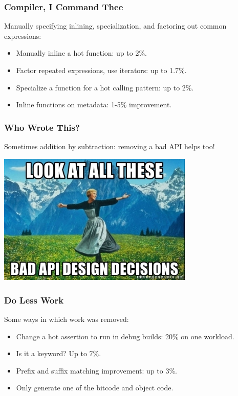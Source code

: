 \begin{frame}
\frametitle{Compiler, I Command Thee}

 Manually specifying inlining, specialization, and factoring out common expressions:
\begin{itemize}
	\item Manually inline a hot function: up to 2\%.
	\item Factor repeated expressions, use iterators: up to 1.7\%.
	\item Specialize a function for a hot calling pattern: up to 2\%.
	\item Inline functions on metadata: 1-5\% improvement.
\end{itemize}


\end{frame}


\begin{frame}
\frametitle{Who Wrote This?}

Sometimes addition by subtraction: removing a bad API helps too!

\begin{center}
	\includegraphics[width=0.7\textwidth]{images/bad-api.jpg}
\end{center}


\end{frame}


\begin{frame}
\frametitle{Do Less Work}

Some ways in which work was removed:

\begin{itemize}
	\item Change a hot assertion to run in debug builds: 20\% on one workload.
	\item Is it a keyword? Up to 7\%.
	\item Prefix and suffix matching improvement: up to 3\%.
	\item Only generate one of the bitcode and object code.
\end{itemize}


\end{frame}


